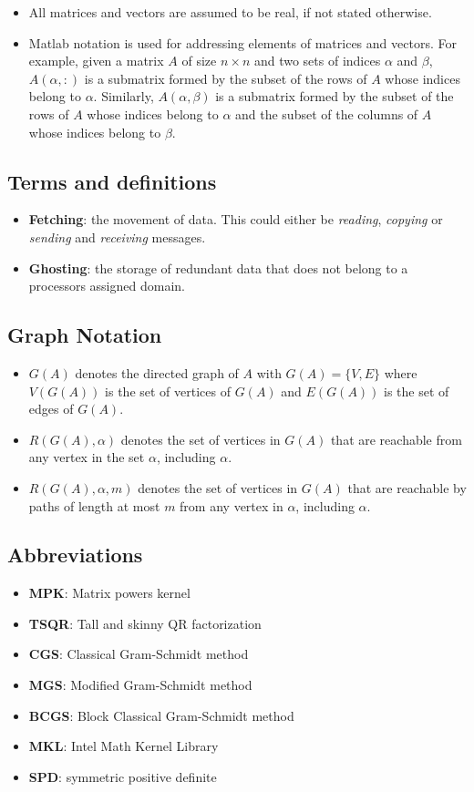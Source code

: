 \documentclass{scrartcl}
\numberwithin{equation}{section}
\begin{document}
\begin{itemize}
\item All matrices and vectors are assumed to be real, if not stated otherwise.
\item Matlab notation is used for addressing elements of matrices and vectors. For example, given a matrix $A$ of size $n \times n$ and two sets of indices $\alpha$ and $\beta$, $A(\alpha,:)$ is a submatrix formed by the subset of the rows of $A$ whose indices belong to $\alpha$. Similarly, $A(\alpha, \beta)$ is a submatrix formed by the subset of the rows of $A$ whose indices belong to $\alpha$ and the subset of the columns of $A$ whose indices belong to $\beta$.
\end{itemize}

\subsection*{Terms and definitions}
\begin{itemize}
\item \textbf{Fetching}: the movement of data. This could either be \textit{reading}, \textit{copying} or \textit{sending} and \textit{receiving} messages.
\item \textbf{Ghosting}: the storage of redundant data that does not belong to a processors assigned domain.
\end{itemize}

\subsection*{Graph Notation}
\begin{itemize}
\item $G(A)$ denotes the directed graph of $A$ with $G(A) = \{V,E\}$ where $V(G(A))$ is the set of vertices of $G(A)$ and $E(G(A))$ is the set of edges of $G(A)$.
\item $R(G(A), \alpha)$ denotes the set of vertices in $G(A)$ that are reachable from any vertex in the set $\alpha$, including $\alpha$.
\item $R(G(A), \alpha, m)$ denotes the set of vertices in $G(A)$ that are reachable by paths of length at most $m$ from any vertex in $\alpha$, including $\alpha$.
\end{itemize}

\subsection*{Abbreviations}
\begin{itemize}
\item \textbf{MPK}: Matrix powers kernel
\item \textbf{TSQR}: Tall and skinny QR factorization
\item \textbf{CGS}: Classical Gram-Schmidt method
\item \textbf{MGS}: Modified Gram-Schmidt method
\item \textbf{BCGS}: Block Classical Gram-Schmidt method
\item \textbf{MKL}: Intel Math Kernel Library
\item \textbf{SPD}: symmetric positive definite
\end{itemize}
\pagebreak
\end{document}
